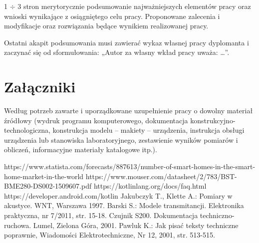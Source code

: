 \documentclass[12pt]{article}
\begin{document}
1 $\div$ 3 stron merytorycznie podsumowanie najważniejszych elementów pracy oraz wnioski wynikające z osiągniętego celu pracy. Proponowane zalecenia i modyfikacje oraz rozwiązania będące wynikiem realizowanej pracy.

Ostatni akapit podsumowania musi zawierać wykaz własnej pracy dyplomanta i zaczynać się od sformułowania: „Autor za własny wkład pracy uważa: \ldots”.

\clearpage

\section*{Załączniki}

Według potrzeb zawarte i uporządkowane uzupełnienie pracy o dowolny materiał źródłowy (wydruk programu komputerowego, dokumentacja kons\-truk\-cyj\-no-\-tech\-no\-lo\-gicz\-na, konstrukcja modelu -- makiety -- urządzenia, instrukcja obsługi urządzenia lub stanowiska laboratoryjnego, zestawienie wyników pomiarów i obliczeń, informacyjne materiały katalogowe itp.).


\clearpage


\begin{thebibliography}{4}
     https://www.statista.com/forecasts/887613/number-of-smart-homes-in-the-smart-home-market-in-the-world
     https://www.mouser.com/datasheet/2/783/BST-BME280-DS002-1509607.pdf
     https://kotlinlang.org/docs/faq.html
     https://developer.android.com/kotlin
     Jakubczyk T., Klette A.: Pomiary w akustyce. WNT, Warszawa 1997.
     Barski S.: Modele transmitancji. Elektronika praktyczna, nr 7/2011, str. 15-18.
     Czujnik S200. Dokumentacja techniczno-ruchowa. Lumel, Zielona Góra, 2001.
     Pawluk K.: Jak pisać teksty techniczne poprawnie, Wiadomości Elektrotechniczne, Nr 12, 2001, str. 513-515.
\end{thebibliography}

\clearpage

\makesummary
\end{document}
